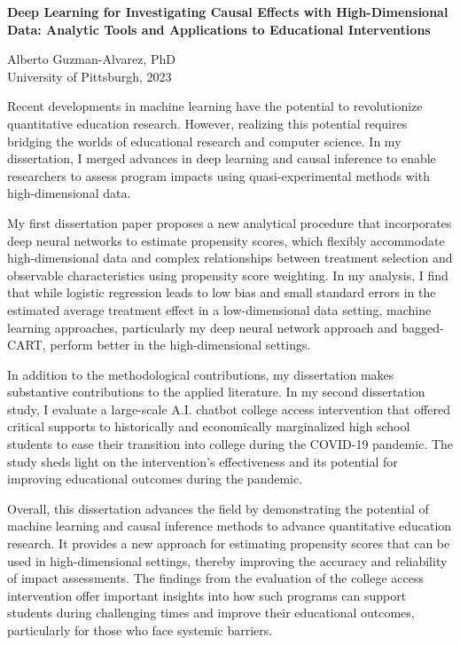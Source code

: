 \pagestyle{plain}

\begin{center}
   \begin{singlespace}
        \textbf{Deep Learning for Investigating Causal Effects with High-Dimensional Data: Analytic Tools and Applications to Educational Interventions}
   \end{singlespace}
   
   \vspace{1\baselineskip}
   
        Alberto Guzman-Alvarez, PhD\\
        University of Pittsburgh, 2023\\
\end{center}
\vspace*{1\baselineskip}


Recent developments in machine learning have the potential to revolutionize quantitative education research. However, realizing this potential requires bridging the worlds of educational research and computer science. In my dissertation, I merged advances in deep learning and causal inference to enable researchers to assess program impacts using quasi-experimental methods with high-dimensional data.

My first dissertation paper proposes a new analytical procedure that incorporates deep neural networks to estimate propensity scores, which flexibly accommodate high-dimensional data and complex relationships between treatment selection and observable characteristics using propensity score weighting. In my analysis, I find that while logistic regression leads to low bias and small standard errors in the estimated average treatment effect in a low-dimensional data setting, machine learning approaches, particularly my deep neural network approach and bagged-CART, perform better in the high-dimensional settings.

In addition to the methodological contributions, my dissertation makes substantive contributions to the applied literature. In my second dissertation study, I evaluate a large-scale A.I. chatbot college access intervention that offered critical supports to historically and economically marginalized high school students to ease their transition into college during the COVID-19 pandemic. The study sheds light on the intervention's effectiveness and its potential for improving educational outcomes during the pandemic.

Overall, this dissertation advances the field by demonstrating the potential of machine learning and causal inference methods to advance quantitative education research. It provides a new approach for estimating propensity scores that can be used in high-dimensional settings, thereby improving the accuracy and reliability of impact assessments. The findings from the evaluation of the college access intervention offer important insights into how such programs can support students during challenging times and improve their educational outcomes, particularly for those who face systemic barriers.

\newpage